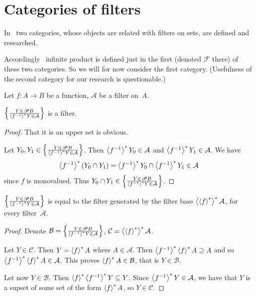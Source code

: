 \chapter{Categories of filters}

In~\cite{filt-cat} two categories, whose objects are related with filters on sets, are defined and researched.

Accordingly~\cite{filt-cat} infinite product is defined just in the first (denoted $\mathscr{F}$ there) of these two categories.
So we will for now consider the first category. (Usefulness of the second category for our research is questionable.)

Let $f:A\rightarrow B$ be a function, $\mathcal{A}$ be a filter on~$A$.

\begin{prop}
$\left\{ \frac{Y\in\mathscr{P} B}{\left\langle f^{-1}\right\rangle ^{\ast}Y\in\mathcal{A}}\right\}$ is a filter.
\end{prop}

\begin{proof}
That it is an upper set is obvious.

Let $Y_0,Y_1\in\left\{ \frac{Y\in\mathscr{P} B}{\left\langle f^{-1}\right\rangle ^{\ast}Y\in\mathcal{A}}\right\}$. Then
$\left\langle f^{-1}\right\rangle ^{\ast}Y_0\in\mathcal{A}$ and $\left\langle f^{-1}\right\rangle ^{\ast}Y_1\in\mathcal{A}$.
We have
\[ \left\langle f^{-1}\right\rangle ^{\ast}(Y_0\cap Y_1) = \left\langle f^{-1}\right\rangle ^{\ast}Y_0 \cap \left\langle f^{-1}\right\rangle ^{\ast}Y_1 \in \mathcal{A} \]
since $f$ is monovalued.
Thus $Y_0 \cap Y_1\in\left\{ \frac{Y\in\mathscr{P} B}{\left\langle f^{-1}\right\rangle ^{\ast}Y\in\mathcal{A}}\right\}$.
\end{proof}

\begin{thm}
$\left\{ \frac{Y\in\mathscr{P} B}{\left\langle f^{-1}\right\rangle ^{\ast}Y\in\mathcal{A}}\right\}$ is equal to the filter generated
by the filter base $\left\langle \left\langle f\right\rangle ^{\ast}\right\rangle ^{\ast}\mathcal{A}$, for every filter~$\mathcal{A}$.
\end{thm}

\begin{proof}
Denote $\mathcal{B} = \left\{ \frac{Y\in\mathscr{P} B}{\left\langle f^{-1}\right\rangle ^{\ast}Y\in\mathcal{A}}\right\}$,
$\mathcal{C} = \left\langle \left\langle f\right\rangle ^{\ast}\right\rangle ^{\ast}\mathcal{A}$.

Let $Y\in\mathcal{C}$. Then $Y=\left\langle f\right\rangle ^{\ast}A$ where $A\in\mathcal{A}$.
Then $\left\langle f^{-1}\right\rangle ^{\ast}\left\langle f\right\rangle ^{\ast}A\supseteq A$ and so $\left\langle f^{-1}\right\rangle ^{\ast}\left\langle f\right\rangle ^{\ast}A\in\mathcal{A}$.
This proves $\left\langle f\right\rangle ^{\ast}A\in\mathcal{B}$, that is $Y\in\mathcal{B}$.

Let now $Y\in\mathcal{B}$. Then $\left\langle f\right\rangle ^{\ast}\left\langle f^{-1}\right\rangle ^{\ast}Y\subseteq Y$. Since $\left\langle f^{-1}\right\rangle ^{\ast}Y\in\mathcal{A}$,
we have that $Y$ is a supset of some set of the form $\left\langle f\right\rangle ^{\ast}A$, so $Y\in\mathcal{C}$.
\end{proof}


